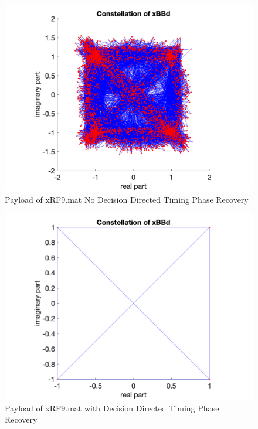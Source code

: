 \begin{figure}[h!]
    \centering
    \includegraphics[scale=0.4]{figures/no-timing-phase-corr-xrf9.png}
    \caption{Payload of xRF9.mat No Decision Directed Timing Phase Recovery}
    \label{fig:no-dd}
\end{figure}
\begin{figure}[h!]
    \centering
    \includegraphics[scale=0.4]{figures/timing-phase-corrected-xrf9.png}
    \caption{Payload of xRF9.mat with Decision Directed Timing Phase Recovery}
    \label{fig:with-dd}
\end{figure}

